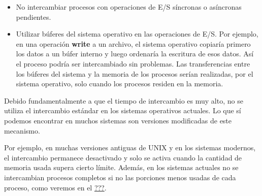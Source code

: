 \begin{itemize}
  \begin{itemize}
  \item
    No intercambiar procesos con operaciones de E/S síncronas o
    asíncronas pendientes.
  \item
    Utilizar búferes del sistema operativo en las operaciones de E/S.
    Por ejemplo, en una operación \textbf{write} a un archivo, el
    sistema operativo copiaría primero los datos a un búfer interno y
    luego ordenaría la escritura de esos datos. Así el proceso podría
    ser intercambiado sin problemas. Las transferencias entre los
    búferes del sistema y la memoria de los procesos serían realizadas,
    por el sistema operativo, solo cuando los procesos residen en la
    memoria.
  \end{itemize}
\end{itemize}

Debido fundamentalmente a que el tiempo de intercambio es muy alto, no
se utiliza el intercambio estándar en los sistemas operativos actuales.
Lo que sí podemos encontrar en muchos sistemas son versiones modificadas
de este mecanismo.

Por ejemplo, en muchas versiones antiguas de UNIX y en los sistemas
modernos, el intercambio permanece desactivado y solo se activa cuando
la cantidad de memoria usada supera cierto límite. Además, en los
sistemas actuales no se intercambian procesos completos si no las
porciones menos usadas de cada proceso, como veremos en el
\hyperref[memoria_virtual]{???}.
